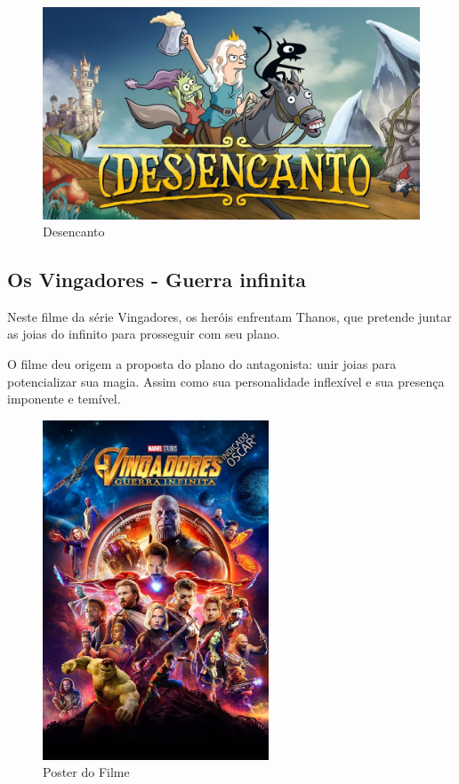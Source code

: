 \begin{figure}[!htb] \caption{\label{Desencanto}Desencanto} \begin{center}
\includegraphics[width=\textwidth]{imagens/Desencanto.jpg} \end{center}
 \end{figure}

\clearpage

\subsection{Os Vingadores - Guerra infinita}

Neste filme da série Vingadores, os heróis enfrentam Thanos, que pretende juntar as joias do infinito para prosseguir com seu plano.

O filme deu origem a proposta do plano do antagonista: unir joias para potencializar sua magia. Assim como sua personalidade inflexível e sua presença imponente e temível.

\begin{figure}[!htb] \caption{\label{vingadores}Poster do Filme} \begin{center}
\includegraphics[width=0.6\textwidth]{imagens/vingadores.jpeg} \end{center}
 \end{figure}

